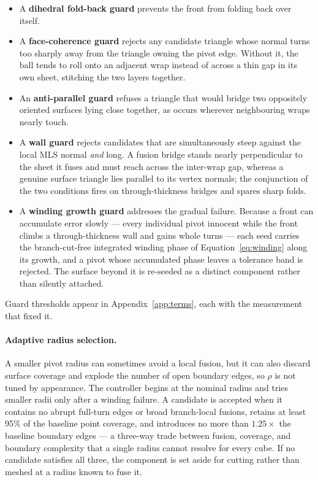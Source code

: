 \begin{itemize}
  \setlength{\itemsep}{2pt}
  \item A \textbf{dihedral fold-back guard} prevents the front from folding back over itself.
  \item A \textbf{face-coherence guard} rejects any candidate triangle whose normal turns too sharply away from the triangle owning the pivot edge. Without it, the ball tends to roll onto an adjacent wrap instead of across a thin gap in its own sheet, stitching the two layers together.
  \item An \textbf{anti-parallel guard} refuses a triangle that would bridge two oppositely oriented surfaces lying close together, as occurs wherever neighbouring wraps nearly touch.
  \item A \textbf{wall guard} rejects candidates that are simultaneously steep against the local MLS normal \emph{and} long. A fusion bridge stands nearly perpendicular to the sheet it fuses and must reach across the inter-wrap gap, whereas a genuine surface triangle lies parallel to its vertex normals; the conjunction of the two conditions fires on through-thickness bridges and spares sharp folds.
  \item A \textbf{winding growth guard} addresses the gradual failure. Because a front can accumulate error slowly --- every individual pivot innocent while the front climbs a through-thickness wall and gains whole turns --- each seed carries the branch-cut-free integrated winding phase of Equation~\eqref{eq:winding} along its growth, and a pivot whose accumulated phase leaves a tolerance band is rejected. The surface beyond it is re-seeded as a distinct component rather than silently attached.
\end{itemize}

Guard thresholds appear in Appendix~\ref{app:terms}, each with the measurement that fixed it.

\paragraph{Adaptive radius selection.} A smaller pivot radius can sometimes avoid a local fusion, but it can also discard surface coverage and explode the number of open boundary edges, so $\rho$ is not tuned by appearance. The controller begins at the nominal radius and tries smaller radii only after a winding failure. A candidate is accepted when it contains no abrupt full-turn edges or broad branch-local fusions, retains at least 95\% of the baseline point coverage, and introduces no more than $1.25\times$ the baseline boundary edges --- a three-way trade between fusion, coverage, and boundary complexity that a single radius cannot resolve for every cube. If no candidate satisfies all three, the component is set aside for cutting rather than meshed at a radius known to fuse it.

